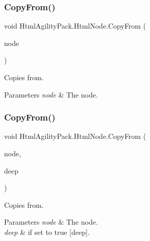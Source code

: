 \subsubsection{\texorpdfstring{Copy\+From()}{CopyFrom()}\hspace{0.1cm}{\footnotesize\ttfamily [1/2]}}
{\footnotesize\ttfamily void Html\+Agility\+Pack.\+Html\+Node.\+Copy\+From (\begin{DoxyParamCaption}\item[{\hyperlink{class_html_agility_pack_1_1_html_node}{Html\+Node}}]{node }\end{DoxyParamCaption})\hspace{0.3cm}{\ttfamily [inline]}}



Copies from. 


\begin{DoxyParams}{Parameters}
{\em node} & The node.\\
\hline
\end{DoxyParams}
\mbox{\label{class_html_agility_pack_1_1_html_node_a6e9022ec07b83d20389c25c431812a49}} 
\subsubsection{\texorpdfstring{Copy\+From()}{CopyFrom()}\hspace{0.1cm}{\footnotesize\ttfamily [2/2]}}
{\footnotesize\ttfamily void Html\+Agility\+Pack.\+Html\+Node.\+Copy\+From (\begin{DoxyParamCaption}\item[{\hyperlink{class_html_agility_pack_1_1_html_node}{Html\+Node}}]{node,  }\item[{bool}]{deep }\end{DoxyParamCaption})\hspace{0.3cm}{\ttfamily [inline]}}



Copies from. 


\begin{DoxyParams}{Parameters}
{\em node} & The node.\\
\hline
{\em deep} & if set to {\ttfamily true} \mbox{[}deep\mbox{]}.\\
\hline
\end{DoxyParams}

